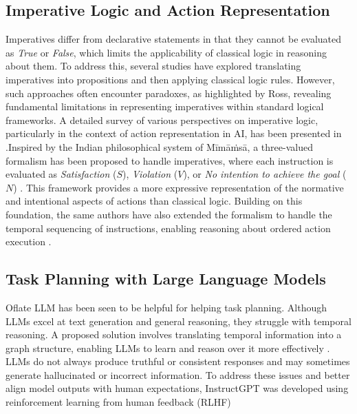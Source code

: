 \documentclass[a4paper,11pt]{lmcs}
\newcommand{\mimamsa}{M\={i}m\={a}\.ms\={a}}
\begin{document}
\subsection{Imperative Logic and Action Representation}
Imperatives differ from declarative statements in that they cannot be evaluated as \textit{True} or \textit{False}, which limits the applicability of classical logic in reasoning about them. To address this, several studies have explored translating imperatives into propositions and then applying classical logic rules. However, such approaches often encounter paradoxes, as highlighted by Ross, revealing fundamental limitations in representing imperatives within standard logical frameworks. A detailed survey of various perspectives on imperative logic, particularly in the context of action representation in AI, has been presented in \citep{survey}.Inspired by the Indian philosophical system of \mimamsa, a three-valued formalism has been proposed to handle imperatives, where each instruction is evaluated as \textit{Satisfaction} ($S$), \textit{Violation} ($V$), or \textit{No intention to achieve the goal} ($N$) \citep{mira}. This framework provides a more expressive representation of the normative and intentional aspects of actions than classical logic. Building on this foundation, the same authors have also extended the formalism to handle the temporal sequencing of instructions, enabling reasoning about ordered action execution \citep{llmmira}.

\subsection{Task Planning with Large Language Models}
Oflate LLM has been seen to be helpful for helping task planning.
 Although LLMs excel at text generation and general reasoning, they struggle with temporal reasoning. A proposed solution involves translating temporal information into a graph structure, enabling LLMs to learn and reason over it more effectively \citep{xiong}. LLMs do not always produce truthful or consistent responses and may sometimes generate hallucinated or incorrect information. To address these issues and better align model outputs with human expectations, InstructGPT was developed using reinforcement learning from human feedback (RLHF) \citep{llm_human}
\end{document}
